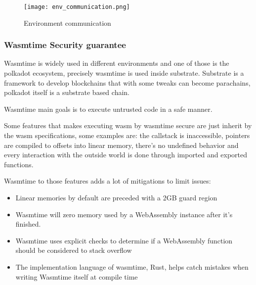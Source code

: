 \documentclass[../main.tex]{subfiles}
\begin{document}
\begin{figure}[h]
  \centering
  \texttt{[image: env\_communication.png]}
  \caption{Environment communication}
  \label{fig:env-communication}
\end{figure}

\subsubsection{Wasmtime Security guarantee}

Wasmtime is widely used in different environments and one of those is the polkadot ecosystem, precisely wasmtime is used inside substrate. Substrate is a framework to develop blockchains that with some tweaks can become parachains, polkadot itself is a substrate based chain.

Wasmtime main goals is to execute untrusted code in a safe manner.~\cite{wasmtime-book}

Some features that makes executing wasm by wasmtime secure are just inherit by the wasm specifications, some examples are: the callstack is inaccessible, pointers are compiled to offsets into linear memory, there's no undefined behavior and every interaction with the outside world is done through imported and exported functions.~\cite{wasmtime-book}

Wasmtime to those features adds a lot of mitigations to limit issues:
\begin{itemize}
  \item Linear memories by default are preceded with a 2GB guard region
  \item Wasmtime will zero memory used by a WebAssembly instance after it's finished.
  \item Wasmtime uses explicit checks to determine if a WebAssembly function should be considered to stack overflow
  \item The implementation language of wasmtime, Rust, helps catch mistakes when writing Wasmtime itself at compile time
\end{itemize}
\end{document}
